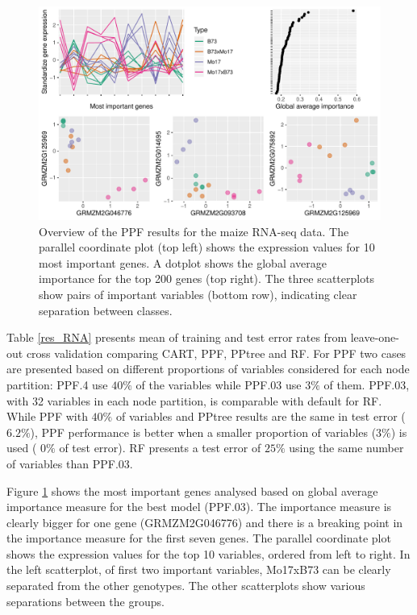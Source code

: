 \documentclass[12pt]{article}\usepackage[]{graphicx}\usepackage[]{color}
\makeatletter
\def\maxwidth{ %
  \ifdim\Gin@nat@width>\linewidth
    \linewidth
  \else
    \Gin@nat@width
  \fi
}
\newenvironment{knitrout}{}{} %
\makeatother
\begin{document}
\begin{figure}[!ht]
\centering
\begin{knitrout}
\color{fgcolor}
\includegraphics[width=\maxwidth]{figure/rnaseq-1} 

\end{knitrout}
\caption{Overview of the PPF results for the maize RNA-seq data. The parallel coordinate plot (top left) shows the expression values for 10 most important genes. A dotplot shows the global average importance for the top 200 genes (top right). The three scatterplots show pairs of important variables  (bottom row), indicating clear separation between classes. \label{rnacomp}}
\end{figure}




Table \ref{res_RNA} presents mean of training and test error rates from leave-one-out cross validation comparing CART, PPF, PPtree and RF. For PPF two cases are presented based on different proportions of variables considered for each node partition: PPF.4 use $40\%$ of the variables while  PPF.03 use $3\%$ of them. PPF.03, with 32 variables in each node partition, is comparable with default for RF. While PPF with $40\%$ of variables and PPtree results are the same in test error ($6.2\%$), PPF performance is better  when a smaller proportion of variables ($3\%$) is used ( $0\%$ of test error). RF presents a test error of $25\%$ using the same number of variables than PPF.03.

Figure \ref{rnacomp} shows the most important genes analysed based on global average importance measure for the best model (PPF.03). The importance measure is clearly bigger for one gene (GRMZM2G046776) and there is a breaking point in the importance measure for the first seven genes. The parallel coordinate plot shows the expression values for the top 10 variables, ordered from left to right. In the left scatterplot, of first two important variables, Mo17xB73 can be clearly separated from the other genotypes. The other scatterplots show various separations between the groups. 
\end{document}
